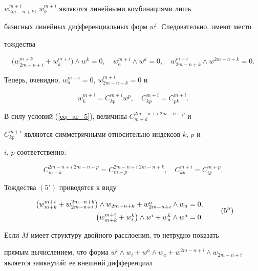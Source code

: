$w^{m+i}_{2m-n+k}$, $w^{m+i}_{k}$ являются линейными комбинациями лишь


базисных линейных дифференциальных форм $w^i$. Следовательно, имеют место


тождества


$$


\big(w^{m+k}_{2m-n+i}+w^{m+i}_k\big)\wedge w^k=0,\quad


w^{m+i}_a\wedge w^a=0,\quad w^{m+i}_{2m-n+k}\wedge w^{2m-n+k}=0.


$$


Теперь, очевидно, $w^{m+i}_a=0$, $w^{m+i}_{2m-n+k}=0$ и


$$


w^{m+i}_k=C^{m+i}_{kp}w^p,\quad C^{m+i}_{kp}=C^{m+i}_{pk}.


$$


В силу условий (\ref{eq_ar_5}), величины $C^{2m-n+i\; 2m-n+p}_{m+k}$ и


$C^{m+i}_{kp}$ являются симметричными относительно индексов $k$, $p$ и


$i$, $p$ соответственно:


$$


C^{2m-n+i\; 2m-n+p}_{m+k}=C^{2m-n+i\; 2m-n+k}_{m+p},\quad


C^{m+i}_{kp}=C^{m+p}_{ik}.


$$


Тождества $(5')$ приводятся к виду


\begin{equation}




\begin{array}{r}


\big(w^{m+i}_{m+k}+w^{2m-n+k}_{2m-n+i}\big)\wedge w_{2m-n+k}+


w^{a}_{2m-n+i}\wedge w_{a}=0,\\[2mm]


\big(w_{m+k}^{m+i}+w^k_i\big)\wedge w^i+ w^k_a\wedge w^a=0.


\end{array}


\tag{$5{}''$}


\end{equation}


Если $M$ имеет структуру двойного расслоения, то нетрудно показать


прямым вычислением, что форма $w^i\wedge w_i +w^a\wedge w_a +w^{2m-


n+i}\wedge w_{2m-n+i}$ является замкнутой: ее внешний дифференциал


